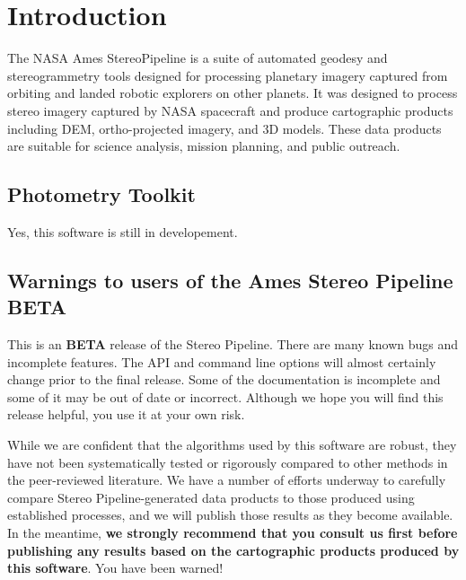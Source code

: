 \chapter{Introduction}

The NASA Ames StereoPipeline is a suite of automated geodesy and
stereogrammetry tools designed for processing planetary imagery
captured from orbiting and landed robotic explorers on other planets.
It was designed to process stereo imagery captured by NASA
spacecraft and produce cartographic products including DEM,
ortho-projected imagery, and 3D models.  These data products are
suitable for science analysis, mission planning, and public outreach.

\section{Photometry Toolkit}
Yes, this software is still in developement.

\section{Warnings to users of the Ames Stereo Pipeline BETA}

This is an {\bf BETA} release of the Stereo Pipeline.  There are many
known bugs and incomplete features. The API and command line options
will almost certainly change prior to the final release.  Some of the
documentation is incomplete and some of it may be out of date or
incorrect.  Although we hope you will find this release helpful, you
use it at your own risk.

While we are confident that the algorithms used by this software are
robust, they have not been systematically tested or rigorously
compared to other methods in the peer-reviewed literature. We have a
number of efforts underway to carefully compare Stereo
Pipeline-generated data products to those produced using established
processes, and we will publish those results as they become available.
In the meantime, {\bf we strongly recommend that you consult us first
  before publishing any results based on the cartographic products
  produced by this software}. You have been warned!

